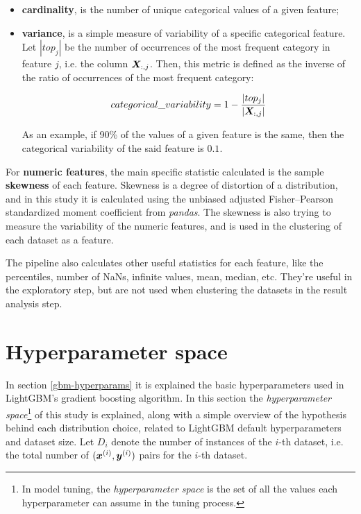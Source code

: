 \begin{itemize}
    \item \textbf{cardinality}, is the number of unique categorical values of a given feature;
    \item \textbf{variance}, is  a simple measure of variability of a specific categorical feature.
    Let $|top_{j}|$ be the number of occurrences of the most frequent category in feature $j$, i.e. the column $\bm{X}_{:, j}$. Then, this metric is defined as the inverse of the ratio of occurrences of the most frequent category:

    $$categorical\_variability=1 - \frac{|top_{j}|}{|\bm{X}_{:, j}|}$$

    As an example, if 90\% of the values of a given feature is the same, then the categorical variability of the said feature is $0.1$.
\end{itemize}

For \textbf{numeric features}, the main specific statistic calculated is the sample \textbf{skewness} of each feature. Skewness is a degree of distortion of a distribution, and in this study it is calculated using the unbiased adjusted Fisher–Pearson standardized moment coefficient from \textit{pandas}. The skewness is also trying to measure the variability of the numeric features, and is used in the clustering of each dataset as a feature.

The pipeline also calculates other useful statistics for each feature, like the percentiles, number of NaNs, infinite values, mean, median, etc. They're useful in the exploratory step, but are not used when clustering the datasets in the result analysis step.

\section{Hyperparameter space}
\label{sec:hyperparam-space}

In section \ref{gbm-hyperparams} it is explained the basic hyperparameters used in LightGBM's gradient boosting algorithm. In this section the \textit{hyperparameter space}\footnote{In model tuning, the \textit{hyperparameter space} is the set of all the values each hyperparameter can assume in the tuning process.} of this study is explained, along with a simple overview of the hypothesis behind each distribution choice, related to LightGBM default hyperparameters and dataset size.  Let $D_i$ denote the number of instances of the $i$-th dataset, i.e. the total number of $(\bm{x}^{(i)},\bm{y}^{(i)})$ pairs for the $i$-th dataset. 

